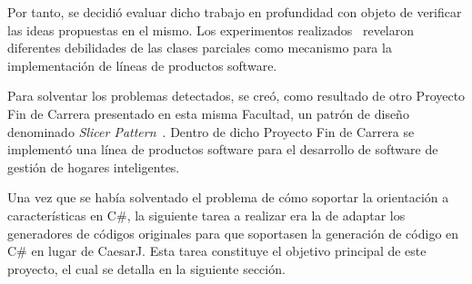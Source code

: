 Por tanto, se decidió evaluar dicho trabajo en profundidad con objeto de verificar las ideas propuestas en el mismo. Los experimentos realizados~\citep{sanchez:2010} revelaron diferentes debilidades de las clases parciales como mecanismo para la implementación de líneas de productos software.

Para solventar los problemas detectados, se creó, como resultado de otro Proyecto Fin de Carrera presentado en esta misma Facultad, un patrón de diseño denominado \emph{Slicer Pattern}~\cite{perez:2011}. Dentro de dicho Proyecto Fin de Carrera se implementó una línea de productos software para el desarrollo de software de gestión de hogares inteligentes.

Una vez que se había solventado el problema de cómo soportar la orientación a características en C\#, la siguiente tarea a realizar era la de adaptar los generadores de códigos originales para que soportasen la generación de código en C\# en lugar de CaesarJ. Esta tarea constituye el objetivo principal de este proyecto, el cual se detalla en la siguiente sección.


